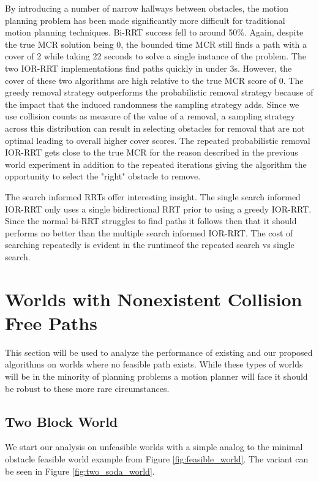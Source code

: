 By introducing a number of narrow hallways between obstacles, the motion planning problem has been made significantly more difficult for traditional motion planning techniques. Bi-RRT success fell to around 50\%. Again, despite the true MCR solution being 0, the bounded time MCR still finds a path with a cover of 2 while taking 22 seconds to solve a single instance of the problem. The two IOR-RRT implementations find paths quickly in under 3s. However, the cover of these two algorithms are high relative to the true MCR score of 0. The greedy removal strategy outperforms the probabilistic removal strategy because of the impact that the induced randomness the sampling strategy adds. Since we use collision counts as measure of the value of a removal, a sampling strategy across this distribution can result in selecting obstacles for removal that are not optimal leading to overall higher cover scores. The repeated probabilistic removal IOR-RRT gets close to the true MCR for the reason described in the previous world experiment in addition to the repeated iterations giving the algorithm the opportunity to select the "right" obstacle to remove. 

The search informed RRTs offer interesting insight. The single search informed IOR-RRT only uses a single bidirectional RRT prior to using a greedy IOR-RRT. Since the normal bi-RRT struggles to find paths it follows then that it should performs no better than the multiple search informed IOR-RRT. The cost of searching repeatedly is evident in the runtimeof the repeated search vs single search.


\section{Worlds with Nonexistent Collision Free Paths}
This section will be used to analyze the performance of existing and our proposed algorithms on worlds where no feasible path exists. While these types of worlds will be in the minority of planning problems a motion planner will face it should be robust to these more rare circumstances. 

\subsection{Two Block World}
We start our analysis on unfeasible worlds with a simple analog to the minimal obstacle feasible world example from Figure \ref{fig:feasible_world}. The variant can be seen in Figure \ref{fig:two_soda_world}.

